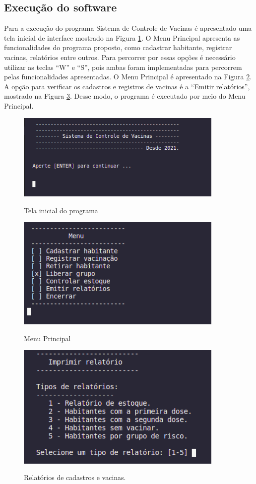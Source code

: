 \documentclass[12pt, a4paper]{article}
\begin{document}
\subsection{Execução do software}\label{Execução do software}
Para a execução do programa Sistema de Controle de Vacinas é apresentado uma tela inicial de interface mostrado na Figura \ref{telainicial}. O Menu Principal apresenta as funcionalidades do programa proposto, como cadastrar habitante, registrar vacinas, relatórios entre outros. Para percorrer por essas opções é necessário utilizar as teclas ``W'' e ``S'', pois ambas foram implementadas para percorrem pelas funcionalidades apresentadas. O Menu Principal é apresentado na Figura \ref{menu}. A opção para verificar os cadastros e registros de vacinas é a ``Emitir relatórios'', mostrado na Figura \ref{relatorio}. Desse modo, o programa é executado por meio do Menu Principal.

\cleardoublepage
\begin{figure}[h]
	\caption{Tela inicial do programa}
	
	\centering %
	\includegraphics[width=10cm]{telaInicial.png} %
	\label{telainicial}
\end{figure}

\begin{figure}[h]
	\caption{Menu Principal}
	
	\centering %
	\includegraphics[width=10cm]{opcoes.png} %
	\label{menu}
\end{figure}

\begin{figure}[!h]
	\caption{Relatórios de cadastros e vacinas.}
	
	\centering %
	\includegraphics[width=10cm]{imprimirRelatorio.png} %
	\label{relatorio}
\end{figure}
\end{document}
